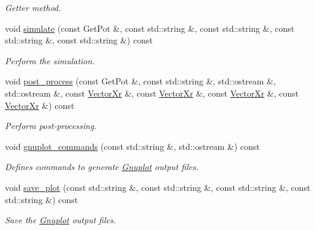 \begin{DoxyCompactItemize}
\begin{DoxyCompactList}\small\item\em Getter method. \end{DoxyCompactList}\item 
void \hyperlink{classDosModel_a5203629bc44905401b1b0d71a021db40}{simulate} (const Get\-Pot \&, const std\-::string \&, const std\-::string \&, const std\-::string \&, const std\-::string \&) const 
\begin{DoxyCompactList}\small\item\em Perform the simulation. \end{DoxyCompactList}\item 
void \hyperlink{classDosModel_a864b576fe626805c8dbf15aac5461a8e}{post\-\_\-process} (const Get\-Pot \&, const std\-::string \&, std\-::ostream \&, std\-::ostream \&, const \hyperlink{typedefs_8h_aae6cee78ed9cd8f234ed8cb48682548a}{Vector\-Xr} \&, const \hyperlink{typedefs_8h_aae6cee78ed9cd8f234ed8cb48682548a}{Vector\-Xr} \&, const \hyperlink{typedefs_8h_aae6cee78ed9cd8f234ed8cb48682548a}{Vector\-Xr} \&, const \hyperlink{typedefs_8h_aae6cee78ed9cd8f234ed8cb48682548a}{Vector\-Xr} \&) const 
\begin{DoxyCompactList}\small\item\em Perform post-\/processing. \end{DoxyCompactList}\item 
void \hyperlink{classDosModel_a26e64253688b5b51ffc54013bf3bc553}{gnuplot\-\_\-commands} (const std\-::string \&, std\-::ostream \&) const 
\begin{DoxyCompactList}\small\item\em Defines commands to generate \hyperlink{index_Gnuplot}{Gnuplot} output files. \end{DoxyCompactList}\item 
void \hyperlink{classDosModel_aa614583c066c644e83085beaad05279d}{save\-\_\-plot} (const std\-::string \&, const std\-::string \&, const std\-::string \&, const std\-::string \&) const 
\begin{DoxyCompactList}\small\item\em Save the \hyperlink{index_Gnuplot}{Gnuplot} output files. \end{DoxyCompactList}\end{DoxyCompactItemize}
